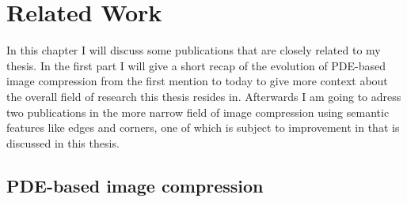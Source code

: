 \chapter{Related Work}\label{ch:RelatedWork}

In this chapter I will discuss some publications that are closely related to my thesis. 
In the first part I will give a short recap of the evolution of PDE-based image compression from
the first mention to today to
give more context about the overall field of research this thesis resides in.
Afterwards I am going to adress two publications in the more narrow field of image compression
using semantic features like edges and corners, one of which is subject to improvement in
that is discussed in this thesis.

\section{PDE-based image compression}

